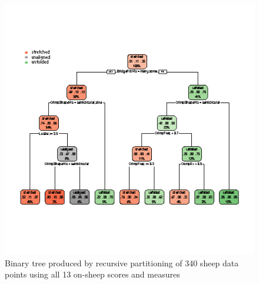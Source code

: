 %

\begin{figure}[!h]
  \centering
  \includegraphics[width=1.1\textwidth]{figrtreeall.png}
  \caption{Binary tree produced by recursive partitioning of 340 sheep data points using all 13 on-sheep scores and measures}
  \label{fig:rtreeall}
\end{figure}

%

